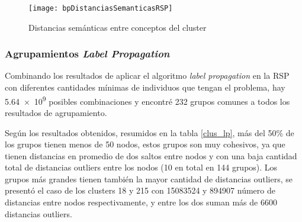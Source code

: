 \begin{figure}[ht]
\caption{Distancias semánticas entre conceptos del cluster}
\label{fig:bpDistanciasSemanticasRSP}
\centering
\texttt{[image: bpDistanciasSemanticasRSP]}
\end{figure}

\subsubsection{Agrupamientos \textit{Label Propagation}}
Combinando los resultados de aplicar el algoritmo \textit{label propagation} en la RSP con diferentes cantidades mínimas de individuos que tengan el problema, hay \num{5.64e9} posibles combinaciones y encontré 232 grupos comunes a todos los resultados de agrupamiento. 

Según los resultados obtenidos, resumidos en la tabla \ref{clus_lp}, más del 50\% de los grupos tienen menos de 50 nodos, estos grupos son muy cohesivos, ya que tienen distancias en promedio de dos saltos entre nodos y con una baja cantidad total de distancias outliers entre los nodos (10 en total en 144 grupos). Los grupos más grandes tienen también la mayor cantidad de distancias outliers, se presentó el caso de los clusters 18 y 215 con \num{15083524} y \num{894907} número de distancias entre nodos respectivamente, y entre los dos suman más de \num{6600} distancias outliers.

